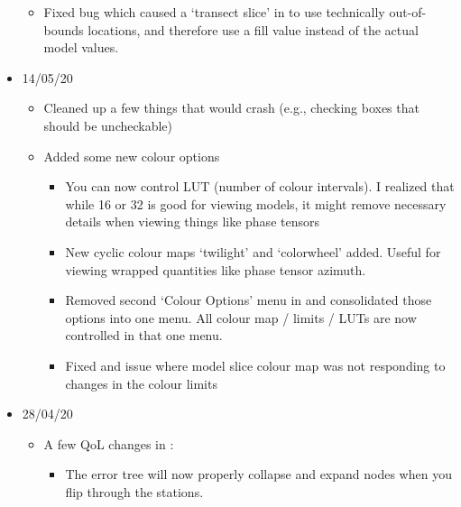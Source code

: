 \documentclass[letterpaper,10pt,english]{sphinxmanual}
\begin{document}
\begin{itemize}
\begin{itemize}
\item {} 
Fixed bug which caused a ‘transect slice’ in {\hyperref[\detokenize{content/model_viewer/main_window:model-viewer}]{}} to use technically out-of-bounds locations, and therefore use a fill value instead of the actual model values.

\end{itemize}

\item {} 
14/05/20
\begin{itemize}
\item {} 
Cleaned up a few things that would crash {\hyperref[\detokenize{content/data_plot/main_window:data-plot}]{}} (e.g., checking boxes that should be uncheckable)

\item {} 
Added some new colour options
\begin{itemize}
\item {} 
You can now control LUT (number of colour intervals). I realized that while 16 or 32 is good for viewing models, it might remove necessary details when viewing things like phase tensors

\item {} 
New cyclic colour maps ‘twilight’ and ‘colorwheel’ added. Useful for viewing wrapped quantities like phase tensor azimuth.

\item {} 
Removed second ‘Colour Options’ menu in {\hyperref[\detokenize{content/data_plot/map_viewer:map-viewer}]{}} and consolidated those options into one menu. All colour map / limits / LUTs are now controlled in that one menu.

\item {} 
Fixed and issue where model slice colour map was not responding to changes in the colour limits

\end{itemize}

\end{itemize}

\item {} 
28/04/20
\begin{itemize}
\item {} 
A few QoL changes in {\hyperref[\detokenize{content/data_plot/main_window:data-plot}]{}}:
\begin{itemize}
\item {} 
The error tree will now properly collapse and expand nodes when you flip through the stations.


\end{itemize}
\end{itemize}
\end{itemize}
\end{document}
